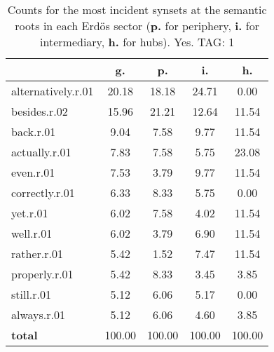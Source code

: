 \begin{table}[h!]
\begin{center}
\begin{tabular}{| l || c | c | c | c |}\hline
 & {\bf g.} & {\bf p.} & {\bf i.} & {\bf h.} \\\hline\hline
alternatively.r.01 & 20.18  & 18.18  & 24.71  & 0.00 \\\hline
besides.r.02 & 15.96  & 21.21  & 12.64  & 11.54 \\\hline
back.r.01 & 9.04  & 7.58  & 9.77  & 11.54 \\\hline
actually.r.01 & 7.83  & 7.58  & 5.75  & 23.08 \\\hline
even.r.01 & 7.53  & 3.79  & 9.77  & 11.54 \\\hline
correctly.r.01 & 6.33  & 8.33  & 5.75  & 0.00 \\\hline
yet.r.01 & 6.02  & 7.58  & 4.02  & 11.54 \\\hline
well.r.01 & 6.02  & 3.79  & 6.90  & 11.54 \\\hline
rather.r.01 & 5.42  & 1.52  & 7.47  & 11.54 \\\hline
properly.r.01 & 5.42  & 8.33  & 3.45  & 3.85 \\\hline
still.r.01 & 5.12  & 6.06  & 5.17  & 0.00 \\\hline
always.r.01 & 5.12  & 6.06  & 4.60  & 3.85 \\\hline\hline
{{\bf total}} & 100.00  & 100.00  & 100.00  & 100.00 \\\hline
\end{tabular}
\caption{Counts for the most incident synsets at the semantic roots in each Erd\"os sector ({\bf p.} for periphery, {\bf i.} for intermediary, {\bf h.} for hubs). Yes. TAG: 1}
\end{center}
\end{table}
